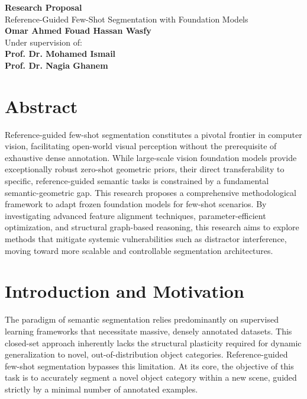 \documentclass[journal,12pt,onecolumn,draftclsnofoot]{IEEEtran}
\begin{document}
\begin{center}
    {\Huge \textbf{Research Proposal}} \\[1em]
    {\LARGE Reference-Guided Few-Shot Segmentation with Foundation Models} \\[1.5em]
    {\large \textbf{Omar Ahmed Fouad Hassan Wasfy}} \\[1em]
    {\large Under supervision of:} \\[0.5em]
    {\large \textbf{Prof. Dr. Mohamed Ismail}} \\
    {\large \textbf{Prof. Dr. Nagia Ghanem}}
\end{center}

\vspace{1.5em}

\section*{Abstract}
\normalsize
Reference-guided few-shot segmentation constitutes a pivotal frontier in computer vision, facilitating open-world visual perception without the prerequisite of exhaustive dense annotation. While large-scale vision foundation models provide exceptionally robust zero-shot geometric priors, their direct transferability to specific, reference-guided semantic tasks is constrained by a fundamental semantic-geometric gap. This research proposes a comprehensive methodological framework to adapt frozen foundation models for few-shot scenarios. By investigating advanced feature alignment techniques, parameter-efficient optimization, and structural graph-based reasoning, this research aims to explore methods that mitigate systemic vulnerabilities such as distractor interference, moving toward more scalable and controllable segmentation architectures.

\section{Introduction and Motivation}

The paradigm of semantic segmentation relies predominantly on supervised learning frameworks that necessitate massive, densely annotated datasets. This closed-set approach inherently lacks the structural plasticity required for dynamic generalization to novel, out-of-distribution object categories. Reference-guided few-shot segmentation bypasses this limitation. At its core, the objective of this task is to accurately segment a novel object category within a new scene, guided strictly by a minimal number of annotated examples.
\end{document}
